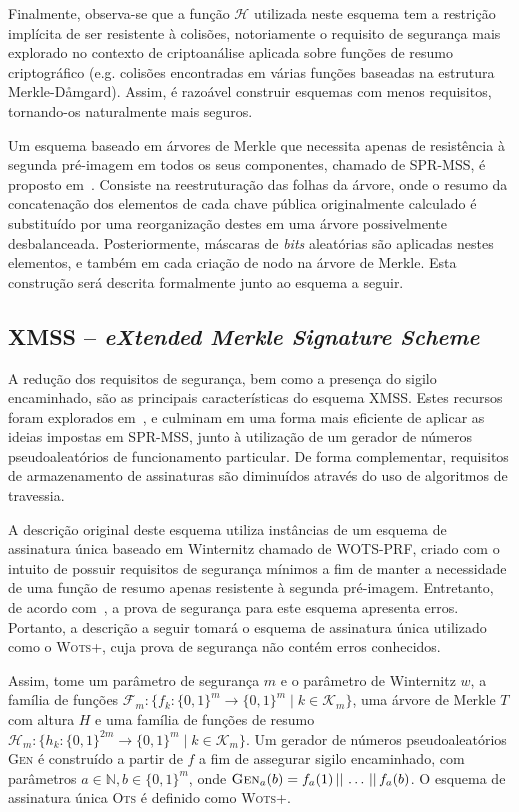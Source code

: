 \documentclass[12pt,notitlepage]{report}
\newcommand{\hh}{\mathcal{H}}
\newcommand{\concat}{\, \vert \vert \,}
\newcommand{\binwds}[1]{\{0, 1\}^{#1}}
\begin{document}
Finalmente, observa-se que a função $\hh{}$ utilizada neste esquema tem a restrição implícita de ser resistente à colisões, notoriamente o requisito de segurança mais explorado no contexto de criptoanálise aplicada sobre funções de resumo criptográfico (e.g. colisões encontradas em várias funções baseadas na estrutura Merkle-D\aa{}mgard). Assim, é razoável construir esquemas com menos requisitos, tornando-os naturalmente mais seguros.

Um esquema baseado em árvores de Merkle que necessita apenas de resistência à segunda pré-imagem em todos os seus componentes, chamado de SPR-MSS, é proposto em~\cite{Dahmen:2008:DSO:1473109.1473117}. Consiste na reestruturação das folhas da árvore, onde o resumo da concatenação dos elementos de cada chave pública originalmente calculado é substituído por uma reorganização destes em uma árvore possivelmente desbalanceada. Posteriormente, máscaras de \emph{bits} aleatórias são aplicadas nestes elementos, e também em cada criação de nodo na árvore de Merkle. Esta construção será descrita formalmente junto ao esquema a seguir.

\subsection{XMSS -- \emph{eXtended Merkle Signature Scheme}}

A redução dos requisitos de segurança, bem como a presença do sigilo encaminhado, são as principais características do esquema XMSS. Estes recursos foram explorados em~\cite{Buchmann:2011:XPF:2184003.2184011}, e culminam em uma forma mais eficiente de aplicar as ideias impostas em SPR-MSS, junto à utilização de um gerador de números pseudoaleatórios de funcionamento particular. De forma complementar, requisitos de armazenamento de assinaturas são diminuídos através do uso de algoritmos de travessia.

A descrição original deste esquema utiliza instâncias de um esquema de assinatura única baseado em Winternitz chamado de WOTS-PRF, criado com o intuito de possuir requisitos de segurança mínimos a fim de manter a necessidade de uma função de resumo apenas resistente à segunda pré-imagem. Entretanto, de acordo com~\cite{LafrancePhilip2017}, a prova de segurança para este esquema apresenta erros. Portanto, a descrição a seguir tomará o esquema de assinatura única utilizado como o \textsc{Wots+}, cuja prova de segurança não contém erros conhecidos.

Assim, tome um parâmetro de segurança $m$ e o parâmetro de Winternitz $w$, a família de funções $\mathcal{F}_m : \{f_k : \binwds{m} \longrightarrow \binwds{m} \mid k \in
\mathcal{K}_m\}$, uma árvore de Merkle $T$ com altura $H$ e uma família de funções de resumo $\hh{}_m : \{h_k : \binwds{2m} \longrightarrow \binwds{m} \mid k \in
\mathcal{K}_m\}$. Um gerador de números pseudoaleatórios \textsc{Gen} é construído a partir de $f$ a fim de assegurar sigilo encaminhado, com parâmetros $a \in \mathbb{N}, b \in \binwds{m}$, onde $\textsc{Gen}_{a}(b) = f_a(1) \concat \dots \concat f_a(b)$. O esquema de assinatura única \textsc{Ots} é definido como \textsc{Wots+}.
\end{document}
